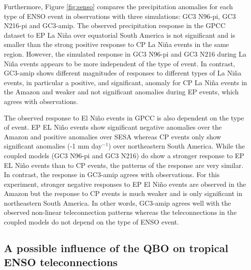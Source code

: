 Furthermore, Figure \ref{fig:senso} compares the precipitation anomalies for each type of ENSO event in observations with three simulations: GC3 N96-pi, GC3 N216-pi and GC3-amip. 
The observed precipitation response in the GPCC dataset to EP La Niña over equatorial South America is not significant and is smaller than the strong positive response to CP La Niña events in the same region. However,  the simulated response in GC3 N96-pi and GC3 N216 during La Niña events appears to be more independent of the type of event. In contrast, GC3-amip shows different magnitudes of responses to different types of La Niña events, in particular a positive, and significant, anomaly for CP La Niña events in the Amazon and weaker and not significant anomalies during EP events, which agrees with observations.

 The observed response to El Niño events in GPCC is also dependent on the type of event. EP EL Niño events show significant negative anomalies over the Amazon and positive anomalies over SESA whereas CP events only show significant anomalies (-1 mm day$^{-1}$) over northeastern South America. While the coupled models (GC3 N96-pi and GC3 N216) do show a stronger response to EP  EL Niño events than to CP events, the patterns of the response are very similar. In contrast, the response in GC3-amip agrees with observations. For this experiment, stronger negative responses to EP El Niño events are observed in the Amazon but the response to CP events is much weaker and is only significant in northeastern South America. In other words, GC3-amip agrees well with the observed non-linear teleconnection patterns whereas the  teleconnections in the coupled models do not depend  on the type of ENSO event.    

\subsection{A possible influence of the QBO on tropical ENSO teleconnections}

